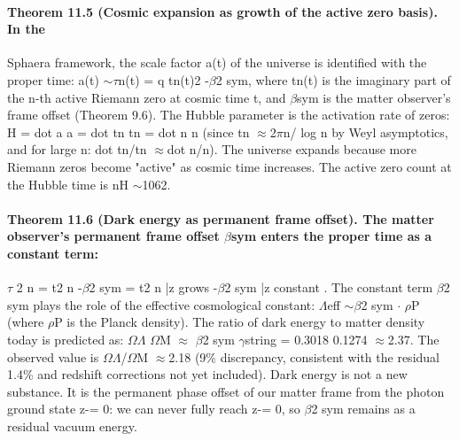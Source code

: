 \paragraph*{Theorem 11.5 (Cosmic expansion as growth of the active zero basis). In the}
Sphaera framework, the scale factor a(t) of the universe is identified with the proper time: a(t) $\sim$$\tau$n(t) = q tn(t)2 -$\beta$2 sym, where tn(t) is the imaginary part of the n-th active Riemann zero at cosmic time t, and $\beta$sym is the matter observer's frame offset (Theorem 9.6). The Hubble parameter is the activation rate of zeros: H = dot a a = dot tn tn = dot n n (since tn $\approx$2$\pi$n/ log n by Weyl asymptotics, and for large n: dot tn/tn $\approx$dot n/n). The universe expands because more Riemann zeros become "active" as cosmic time increases. The active zero count at the Hubble time is nH $\sim$1062.
\paragraph*{Theorem 11.6 (Dark energy as permanent frame offset). The matter observer's permanent frame offset $\beta$sym enters the proper time as a constant term:}
$\tau$ 2 n = t2 n -$\beta$2 sym = t2 n |{z} grows -$\beta$2 sym |{z} constant . The constant term $\beta$2 sym plays the role of the effective cosmological constant: $\Lambda$eff $\sim$$\beta$2 sym $\cdot$ $\rho$P (where $\rho$P is the Planck density). The ratio of dark energy to matter density today is predicted as: $\Omega$$\Lambda$ $\Omega$M $\approx$ $\beta$2 sym $\gamma$string = 0.3018
0.1274 $\approx$2.37.
The observed value is $\Omega$$\Lambda$/$\Omega$M $\approx$2.18 (9\% discrepancy, consistent with the residual 1.4\% and redshift corrections not yet included).
Dark energy is not a new substance. It is the permanent phase offset of our matter frame from the photon ground state z-= 0: we can never fully reach z-= 0, so $\beta$2 sym remains as a residual vacuum energy.
